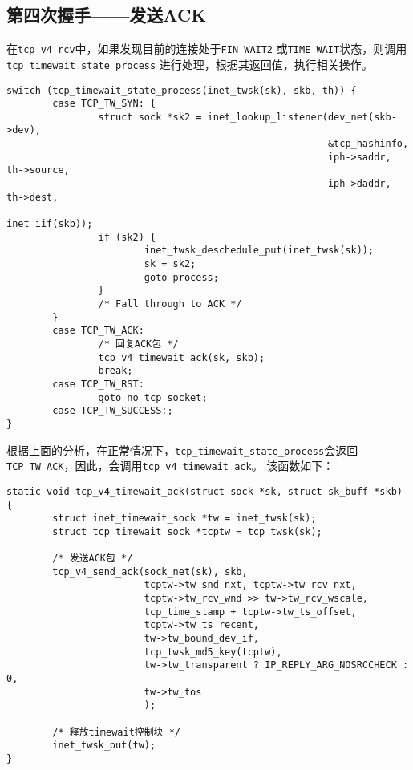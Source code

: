 \subsection{第四次握手——发送ACK}
在\texttt{tcp_v4_rcv}中，如果发现目前的连接处于\texttt{FIN_WAIT2}
或\texttt{TIME_WAIT}状态，则调用\texttt{tcp_timewait_state_process}
进行处理，根据其返回值，执行相关操作。

\begin{verbatim}
switch (tcp_timewait_state_process(inet_twsk(sk), skb, th)) {
        case TCP_TW_SYN: {
                struct sock *sk2 = inet_lookup_listener(dev_net(skb->dev),
                                                        &tcp_hashinfo,
                                                        iph->saddr, th->source,
                                                        iph->daddr, th->dest,
                                                        inet_iif(skb));
                if (sk2) {
                        inet_twsk_deschedule_put(inet_twsk(sk));
                        sk = sk2;
                        goto process;
                }
                /* Fall through to ACK */
        }
        case TCP_TW_ACK:
                /* 回复ACK包 */
                tcp_v4_timewait_ack(sk, skb);
                break;
        case TCP_TW_RST:
                goto no_tcp_socket;
        case TCP_TW_SUCCESS:;
}
\end{verbatim}
根据上面的分析，在正常情况下，\texttt{tcp_timewait_state_process}会返回
\texttt{TCP_TW_ACK}，因此，会调用\texttt{tcp_v4_timewait_ack}。
该函数如下：
\begin{verbatim}
static void tcp_v4_timewait_ack(struct sock *sk, struct sk_buff *skb)
{
        struct inet_timewait_sock *tw = inet_twsk(sk);
        struct tcp_timewait_sock *tcptw = tcp_twsk(sk);

        /* 发送ACK包 */
        tcp_v4_send_ack(sock_net(sk), skb,
                        tcptw->tw_snd_nxt, tcptw->tw_rcv_nxt,
                        tcptw->tw_rcv_wnd >> tw->tw_rcv_wscale,
                        tcp_time_stamp + tcptw->tw_ts_offset,
                        tcptw->tw_ts_recent,
                        tw->tw_bound_dev_if,
                        tcp_twsk_md5_key(tcptw),
                        tw->tw_transparent ? IP_REPLY_ARG_NOSRCCHECK : 0,
                        tw->tw_tos
                        );

        /* 释放timewait控制块 */
        inet_twsk_put(tw);
}
\end{verbatim}
